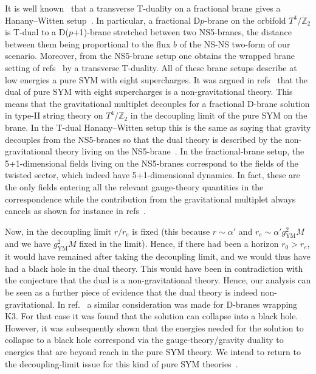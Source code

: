 \documentclass[a4paper,11pt]{article}
\newcommand{\gym}{g_{\mathrm{YM}}}
\newcommand{\ZZ}{\mathbb{Z}}  \newcommand{\Zint}{\mathbb{Z}}
\begin{document}
It is well known~\cite{Karch:1998yv} that a transverse T-duality on a
fractional brane gives a Hanany--Witten setup~\cite{Hanany:1997ie}.
In particular, a fractional D$p$-brane on the orbifold $T^4\!/\ZZ_2$
is  T-dual to a D($p$+1)-brane stretched between two NS5-branes, the
distance  between them being proportional to the flux $b$ of the NS-NS
two-form of  our scenario. Moreover, from the NS5-brane setup one
obtains the wrapped  brane setting of
refs~\cite{Johnson:1999qt,DiVecchia:2001uc} by a transverse
T-duality. All of these brane setups describe at low energies a pure
SYM  with eight supercharges. It was argued in
refs~\cite{Johnson:1999qt,Wijnholt:2001us} that the dual of pure SYM
with eight supercharges is a non-gravitational theory. This means that
the gravitational multiplet decouples for a fractional D-brane
solution in type-II string theory on $T^4\!/\ZZ_2$ in the decoupling
limit of the pure SYM on the brane. In the T-dual Hanany--Witten
setup this is the same as saying that gravity decouples from the
NS5-branes so that the dual theory is described by the
non-gravitational theory living on the
NS5-brane~\cite{Seiberg:1997zk,Dijkgraaf:1997ku,Aharony:1998ub}. In
the fractional-brane setup, the 5+1-dimensional fields living on the
NS5-branes correspond to the fields of the twisted sector, which
indeed have 5+1-dimensional dynamics. In fact, these are the only
fields entering all the relevant gauge-theory quantities in the
correspondence while the contribution from the gravitational
multiplet always cancels as shown for instance in
refs~\cite{Bertolini:2000dk,Grana:2001xn,Bertolini:2001qa,Billo:2001vg,
Klebanov:1999rd,Klebanov:2002gr,Bertolini:2002xu}.

Now, in the decoupling limit $r/r_e$ is fixed (this because $r\sim
\alpha'$ and $r_e\sim\alpha' \gym^2 M$ and we have $\gym^2 M$ fixed in
the limit). Hence, if there had been a horizon $r_0 > r_e$, it would
have remained after taking the decoupling limit, and we would thus
have had a black hole in the dual theory. This would have been in
contradiction with the conjecture that the dual is a non-gravitational
theory. Hence, our analysis can be seen as a further piece of evidence
that the dual theory is indeed non-gravitational. In
ref.~\cite{Johnson:1999qt} a similar  consideration was made for
D-branes wrapping K3. For that case it was found that the solution
can collapse into a black hole. However, it was subsequently shown
that the energies needed for the solution to collapse to a black hole
correspond via the gauge-theory/gravity duality to energies that are
beyond reach in the pure SYM theory. We intend to return to the
decoupling-limit issue for this kind of pure SYM
theories~\cite{Bertolini:2002ab}.
\end{document}
